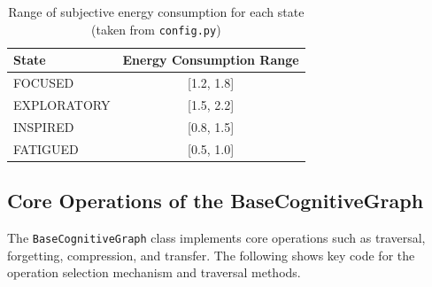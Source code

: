 \documentclass[10pt,onecolumn]{article}
\begin{document}
\begin{table}[H]
\footnotesize
\centering
\caption{Range of subjective energy consumption for each state (taken from \texttt{config.py})}
\label{tab:energy_ranges_app}
\begin{tabular}{lc}
\toprule
\textbf{State} & \textbf{Energy Consumption Range} \\
\midrule
FOCUSED      & [1.2, 1.8] \\
EXPLORATORY  & [1.5, 2.2] \\
INSPIRED     & [0.8, 1.5] \\
FATIGUED     & [0.5, 1.0] \\
\bottomrule
\end{tabular}
\end{table}

\subsection{Core Operations of the BaseCognitiveGraph}
The \texttt{BaseCognitiveGraph} class implements core operations such as traversal, forgetting, compression, and transfer. The following shows key code for the operation selection mechanism and traversal methods.
\end{document}
